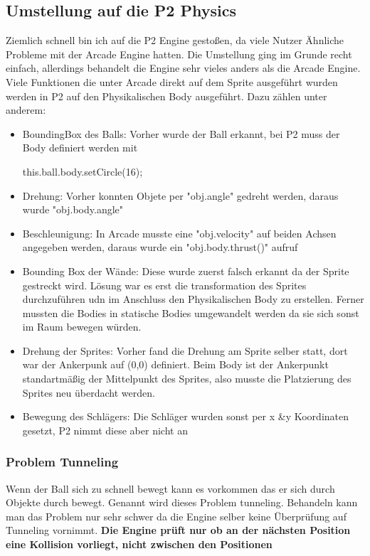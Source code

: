 \subsection{Umstellung auf die P2 Physics}
Ziemlich schnell bin ich auf die P2 Engine gestoßen, da viele Nutzer Ähnliche Probleme mit der Arcade Engine hatten.
\newline
Die Umstellung ging im Grunde recht einfach, allerdings behandelt die Engine sehr vieles anders als die Arcade Engine.
\newline
Viele Funktionen die unter Arcade direkt auf dem Sprite ausgeführt wurden werden in P2 auf den Physikalischen Body ausgeführt. Dazu zählen unter anderem:
\begin{itemize}
	\item
	      BoundingBox des Balls: Vorher wurde der Ball erkannt, bei P2 muss der Body definiert werden mit 
	      \begin{listing}
	      	this.ball.body.setCircle(16);
	      \end{listing}
	\item
	      Drehung: Vorher konnten Objete per "obj.angle" gedreht werden, daraus wurde "obj.body.angle"
	\item
	      Beschleunigung: In Arcade musste eine "obj.velocity" auf beiden Achsen angegeben werden, daraus wurde ein "obj.body.thrust()" aufruf
	\item
	      Bounding Box der Wände: Diese wurde zuerst falsch erkannt da der Sprite gestreckt wird.
	      Lösung war es erst die transformation des Sprites durchzuführen udn im Anschluss den Physikalischen Body zu erstellen.
	      Ferner mussten die Bodies in statische Bodies umgewandelt werden da sie sich sonst im Raum bewegen würden.
	\item
	      Drehung der Sprites: Vorher fand die Drehung am Sprite selber statt, dort war der Ankerpunk auf (0,0) definiert. Beim Body ist der Ankerpunkt standartmäßig der Mittelpunkt des Sprites, also musste die Platzierung des Sprites neu überdacht werden.
	\item
	      Bewegung des Schlägers: Die Schläger wurden sonst per x &y Koordinaten gesetzt, P2 nimmt diese aber nicht an
\end{itemize}
\subsubsection{Problem Tunneling}
Wenn der Ball sich zu schnell bewegt kann es vorkommen das er sich durch Objekte durch bewegt. Genannt wird dieses Problem tunneling.
Behandeln kann man das Problem nur sehr schwer da die Engine selber keine Überprüfung auf Tunneling vornimmt.
\newline
\textbf{Die Engine prüft nur ob an der nächsten Position eine Kollision vorliegt, nicht zwischen den Positionen}
